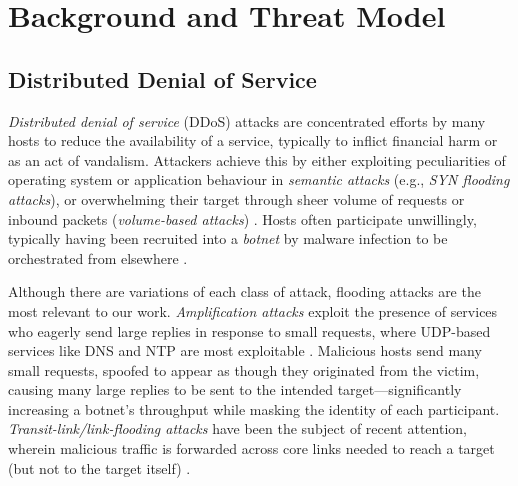 \documentclass[10pt, times, conference, letterpaper]{IEEEtran}
\begin{document}
\section{Background and Threat Model}

\subsection{Distributed Denial of Service}


\emph{Distributed denial of service} (DDoS) attacks are concentrated efforts by many hosts to reduce the availability of a service, typically to inflict financial harm or as an act of vandalism.
Attackers achieve this by either exploiting peculiarities of operating system or application behaviour in \emph{semantic attacks} (e.g., \emph{SYN flooding attacks}), or overwhelming their target through sheer volume of requests or inbound packets (\emph{volume-based attacks}) \cite{DBLP:conf/imc/JonkerKKRSD17}.
Hosts often participate unwillingly, typically having been recruited into a \emph{botnet} by malware infection to be orchestrated from elsewhere \cite{DBLP:conf/uss/AntonakakisABBB17}.

Although there are variations of each class of attack, flooding attacks are the most relevant to our work.
\emph{Amplification attacks} exploit the presence of services who eagerly send large replies in response to small requests, where UDP-based services like DNS and NTP are most exploitable \cite{DBLP:conf/ndss/Rossow14, DBLP:conf/uss/KuhrerHRH14}.
Malicious hosts send many small requests, spoofed to appear as though they originated from the victim, causing many large replies to be sent to the intended target---significantly increasing a botnet's throughput while masking the identity of each participant.
\emph{Transit-link/link-flooding attacks} have been the subject of recent attention, wherein malicious traffic is forwarded across core links needed to reach a target (but not to the target itself) \cite{DBLP:conf/sp/KangLG13, DBLP:conf/esorics/StuderP09}.
\end{document}
